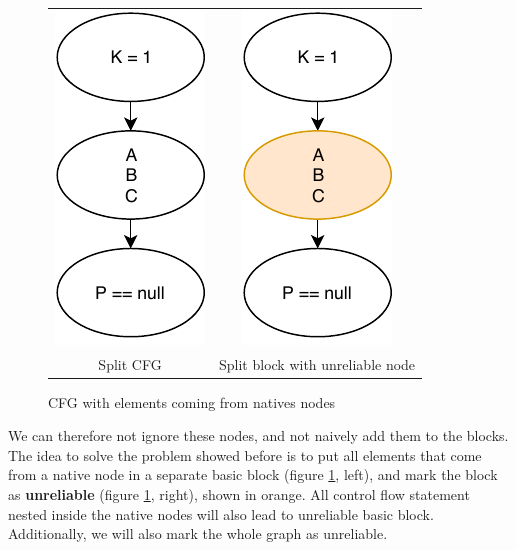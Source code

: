 \begin{figure}[h]
	\caption{CFG with elements coming from natives nodes}
	\label{figure:two-unreliable-cfg}
	\setlength{\tabcolsep}{24pt}
	\begin{tabular}{cc}
		\includegraphics[]{figure/unreliable-cfg-1.pdf}  &
		\includegraphics[]{figure/unreliable-cfg-2.pdf}   \\ 
		Split CFG & Split block with unreliable node
	\end{tabular}
\end{figure}

We can therefore not ignore these nodes, and not naively add them to the blocks.
The idea to solve the problem showed before is to put all elements that come from a native node in a separate basic block (figure \ref{figure:two-unreliable-cfg}, left), and mark the block as \textbf{unreliable} (figure \ref{figure:two-unreliable-cfg}, right), shown in orange.
All control flow statement nested inside the native nodes will also lead to unreliable basic block.\newline
Additionally, we will also mark the whole graph as unreliable. 


